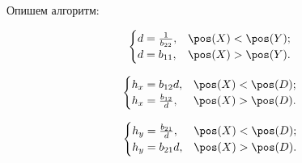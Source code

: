 Опишем алгоритм:

$$\begin{cases}
	d = \frac{1}{b_{22}}, & \pos(X)<\pos(Y); \\
	d = b_{11}, & \pos(X)>\pos(Y).
\end{cases}$$

$$\begin{cases}
	h_x = b_{12} d, & \pos(X)<\pos(D); \\
	h_x = \frac{b_{12}}{d}, & \pos(X)>\pos(D).
\end{cases}$$

$$\begin{cases}
	h_y = \frac{b_{21}}{d}, & \pos(X)<\pos(D);\\
	h_y = b_{21} d, & \pos(X)>\pos(D). \\
\end{cases}$$
